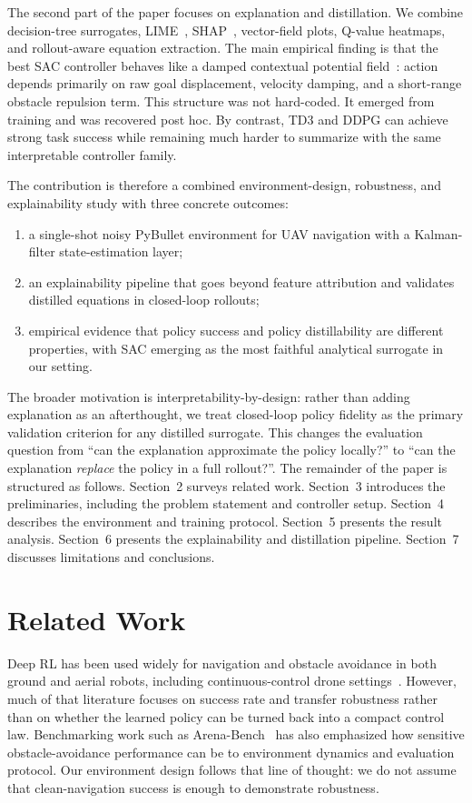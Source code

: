 \documentclass[runningheads]{llncs}
\begin{document}
The second part of the paper focuses on explanation and distillation. We combine decision-tree surrogates, LIME~\cite{Ribeiro2016LIME}, SHAP~\cite{Lundberg2017SHAP}, vector-field plots, Q-value heatmaps, and rollout-aware equation extraction. The main empirical finding is that the best SAC controller behaves like a damped contextual potential field~\cite{Khatib1986APF}: action depends primarily on raw goal displacement, velocity damping, and a short-range obstacle repulsion term. This structure was not hard-coded. It emerged from training and was recovered post hoc. By contrast, TD3 and DDPG can achieve strong task success while remaining much harder to summarize with the same interpretable controller family.

The contribution is therefore a combined environment-design, robustness, and explainability study with three concrete outcomes:
\begin{enumerate}
\item a single-shot noisy PyBullet environment for UAV navigation with a Kalman-filter state-estimation layer;
\item an explainability pipeline that goes beyond feature attribution and validates distilled equations in closed-loop rollouts;
\item empirical evidence that policy success and policy distillability are different properties, with SAC emerging as the most faithful analytical surrogate in our setting.
\end{enumerate}

The broader motivation is interpretability-by-design: rather than adding explanation as an afterthought, we treat closed-loop policy fidelity as the primary validation criterion for any distilled surrogate. This changes the evaluation question from ``can the explanation approximate the policy locally?'' to ``can the explanation \emph{replace} the policy in a full rollout?''. The remainder of the paper is structured as follows. Section~2 surveys related work. Section~3 introduces the preliminaries, including the problem statement and controller setup. Section~4 describes the environment and training protocol. Section~5 presents the result analysis. Section~6 presents the explainability and distillation pipeline. Section~7 discusses limitations and conclusions.

\section{Related Work}
Deep RL has been used widely for navigation and obstacle avoidance in both ground and aerial robots, including continuous-control drone settings~\cite{Marino2024KalmanRL,Huang2024QuadrotorSwarm}. However, much of that literature focuses on success rate and transfer robustness rather than on whether the learned policy can be turned back into a compact control law. Benchmarking work such as Arena-Bench~\cite{Kastner2022ArenaBench} has also emphasized how sensitive obstacle-avoidance performance can be to environment dynamics and evaluation protocol. Our environment design follows that line of thought: we do not assume that clean-navigation success is enough to demonstrate robustness.
\end{document}
